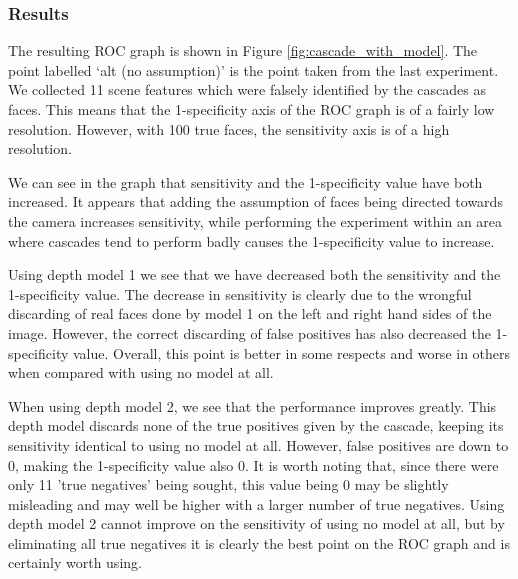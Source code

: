 \documentclass[conference]{IEEEtran}
\begin{document}
\subsubsection{Results}
The resulting ROC graph is shown in Figure \ref{fig:cascade_with_model}. The point labelled `alt (no assumption)' is the point taken from the last experiment. We collected 11 scene features which were falsely identified by the cascades as faces. This means that the 1-specificity axis of the ROC graph is of a fairly low resolution. However, with 100 true faces, the sensitivity axis is of a high resolution.

We can see in the graph that sensitivity and the 1-specificity value have both increased. It appears that adding the assumption of faces being directed towards the camera increases sensitivity, while performing the experiment within an area where cascades tend to perform badly causes the 1-specificity value to increase.

Using depth model 1 we see that we have decreased both the sensitivity and the 1-specificity value. The decrease in sensitivity is clearly due to the wrongful discarding of real faces done by model 1 on the left and right hand sides of the image. However, the correct discarding of false positives has also decreased the 1-specificity value. Overall, this point is better in some respects and worse in others when compared with using no model at all.

When using depth model 2, we see that the performance improves greatly. This depth model discards none of the true positives given by the cascade, keeping its sensitivity identical to using no model at all. However, false positives are down to 0, making the 1-specificity value also 0. It is worth noting that, since there were only 11 'true negatives' being sought, this value being 0 may be slightly misleading and may well be higher with a larger number of true negatives. Using depth model 2 cannot improve on the sensitivity of using no model at all, but by eliminating all true negatives it is clearly the best point on the ROC graph and is certainly worth using.
\end{document}
